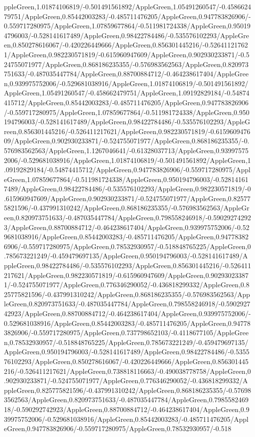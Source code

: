 {\begin{tikzternal}
{ppleGreen,1.01874106819/-0.501491561892/AppleGreen,1.05491260547/-0.458662479751/AppleGreen,0.85442003283/-0.485711476205/AppleGreen,0.947783826906/-0.559717280975/AppleGreen,1.07859677864/-0.511981724338/AppleGreen,0.950194796003/-0.528141617489/AppleGreen,0.98422784486/-0.535576102293/AppleGreen,0.850278616067/-0.420226449666/AppleGreen,0.856301445216/-0.526411217621/AppleGreen,0.982230571819/-0.615960947609/AppleGreen,0.902930233871/-0.524755071977/AppleGreen,0.868186235355/-0.576983562563/AppleGreen,0.820973751633/-0.487035447784/AppleGreen,0.88700884712/-0.464238617404/AppleGreen,0.939975752006/-0.529681038916/AppleGreen,1.01874106819/-0.501491561892/AppleGreen,1.05491260547/-0.458662479751/AppleGreen,1.09192829184/-0.54874415712/AppleGreen,0.85442003283/-0.485711476205/AppleGreen,0.947783826906/-0.559717280975/AppleGreen,1.07859677864/-0.511981724338/AppleGreen,0.950194796003/-0.528141617489/AppleGreen,0.98422784486/-0.535576102293/AppleGreen,0.856301445216/-0.526411217621/AppleGreen,0.982230571819/-0.615960947609/AppleGreen,0.902930233871/-0.524755071977/AppleGreen,0.868186235355/-0.576983562563/AppleGreen,1.1267046641/-0.61328037713/AppleGreen,0.939975752006/-0.529681038916/AppleGreen,1.01874106819/-0.501491561892/AppleGreen,1.09192829184/-0.54874415712/AppleGreen,0.947783826906/-0.559717280975/AppleGreen,1.07859677864/-0.511981724338/AppleGreen,0.950194796003/-0.528141617489/AppleGreen,0.98422784486/-0.535576102293/AppleGreen,0.982230571819/-0.615960947609/AppleGreen,0.902930233871/-0.524755071977/AppleGreen,0.825775821596/-0.437991310242/AppleGreen,0.868186235355/-0.576983562563/AppleGreen,0.820973751633/-0.487035447784/AppleGreen,0.798558246918/-0.590292742923/AppleGreen,0.88700884712/-0.464238617404/AppleGreen,0.939975752006/-0.529681038916/AppleGreen,0.85442003283/-0.485711476205/AppleGreen,0.947783826906/-0.559717280975/AppleGreen,0.78532930957/-0.518848765225/AppleGreen,0.785673221249/-0.459479697135/AppleGreen,0.950194796003/-0.528141617489/AppleGreen,0.98422784486/-0.535576102293/AppleGreen,0.856301445216/-0.526411217621/AppleGreen,0.982230571819/-0.615960947609/AppleGreen,0.902930233871/-0.524755071977/AppleGreen,0.776346290052/-0.436818299332/AppleGreen,0.825775821596/-0.437991310242/AppleGreen,0.868186235355/-0.576983562563/AppleGreen,0.820973751633/-0.487035447784/AppleGreen,0.798558246918/-0.590292742923/AppleGreen,0.88700884712/-0.464238617404/AppleGreen,0.939975752006/-0.529681038916/AppleGreen,0.85442003283/-0.485711476205/AppleGreen,0.947783826906/-0.559717280975/AppleGreen,0.737798652103/-0.4118677105/AppleGreen,0.78532930957/-0.518848765225/AppleGreen,0.785673221249/-0.459479697135/AppleGreen,0.950194796003/-0.528141617489/AppleGreen,0.98422784486/-0.535576102293/AppleGreen,0.850278616067/-0.420226449666/AppleGreen,0.856301445216/-0.526411217621/AppleGreen,0.738818116663/-0.490038778758/AppleGreen,0.902930233871/-0.524755071977/AppleGreen,0.776346290052/-0.436818299332/AppleGreen,0.825775821596/-0.437991310242/AppleGreen,0.868186235355/-0.576983562563/AppleGreen,0.820973751633/-0.487035447784/AppleGreen,0.798558246918/-0.590292742923/AppleGreen,0.88700884712/-0.464238617404/AppleGreen,0.939975752006/-0.529681038916/AppleGreen,0.85442003283/-0.485711476205/AppleGreen,0.947783826906/-0.559717280975/AppleGreen,0.78532930957/-0.518}
\end{tikzternal}}
